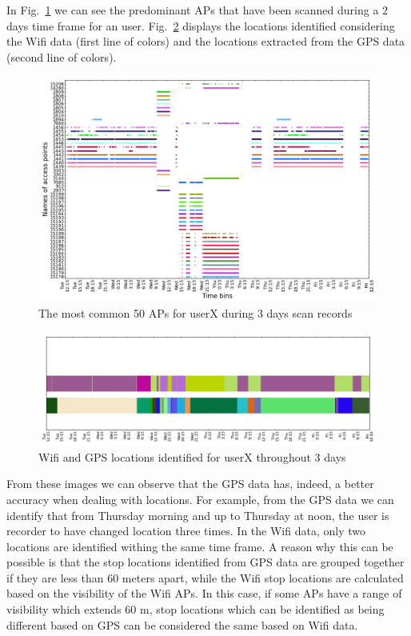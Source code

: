 In Fig.~\ref{user6_aps_2days} we can see the predominant APs that have been
scanned during a $2$ days time frame for an user. Fig.~\ref{user6_hmm_2days}
displays the locations identified considering the Wifi data (first line of
colors) and the locations extracted from the GPS data (second line of colors).

\begin{figure}[!h]
\centering
\includegraphics[width=\textwidth]{figures/gps/user_6_sorted_3days_no_rssi_plot.png}
\caption{The most common 50 APs for userX during 3 days scan records}
\label{user6_aps_2days}
\end{figure}

\begin{figure}[!h]
\centering
\includegraphics[width=\textwidth]{figures/gps/user_6_hmm_and_gps.png}
\caption{Wifi and GPS locations identified for userX throughout 3 days}
\label{user6_hmm_2days}
\end{figure}

From these images we can observe that the GPS data has, indeed, a better
accuracy when dealing with locations. For example, from the GPS data we can
identify that from Thursday morning and up to Thursday at noon, the user is
recorder to have changed location three times. In the Wifi data, only two
locations are identified withing the same time frame. A reason why this can be
possible is that the stop locations identified from GPS data are grouped
together if they are less than $60$ meters apart, while the Wifi stop locations
are calculated based on the visibility of the Wifi APs. In this case, if some
APs have a range of visibility which extends $60$ m, stop locations which can be
identified as being different based on GPS can be considered the same based on
Wifi data.

